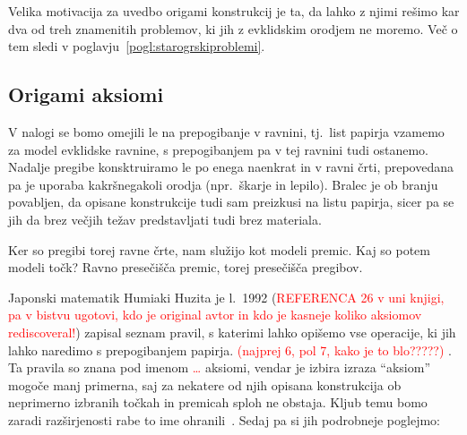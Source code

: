 Velika motivacija za uvedbo origami konstrukcij je ta, da lahko z njimi rešimo kar dva od treh znamenitih problemov, ki jih z evklidskim orodjem ne moremo. Več o tem sledi v poglavju~\ref{pogl:starogrskiproblemi}.

\subsection{Origami aksiomi}

V nalogi se bomo omejili le na prepogibanje v ravnini, tj.\ list papirja vzamemo za model evklidske ravnine, s prepogibanjem pa v tej ravnini tudi ostanemo. Nadalje pregibe konsktruiramo le po enega naenkrat in v ravni črti, prepovedana pa je uporaba kakršnegakoli orodja (npr.\ škarje in lepilo).  Bralec je ob branju povabljen, da opisane konstrukcije tudi sam preizkusi na listu papirja, sicer pa se jih da brez večjih težav predstavljati tudi brez materiala.

Ker so pregibi torej ravne črte, nam služijo kot modeli premic. Kaj so potem modeli točk? Ravno presečišča premic, torej presečišča pregibov.

Japonski matematik Humiaki Huzita je l.\ 1992 (\textcolor{red}{REFERENCA 26 v uni knjigi, pa v bistvu ugotovi, kdo je original avtor in kdo je kasneje koliko aksiomov rediscoveral!}) zapisal seznam pravil, s katerimi lahko opišemo vse operacije, ki jih lahko naredimo s prepogibanjem papirja. \textcolor{red}{(najprej 6, pol 7, kako je to blo?????)}
. Ta pravila so znana pod imenom \textcolor{red}{\ldots} aksiomi, vendar je izbira izraza ``aksiom'' mogoče manj primerna, saj za nekatere od njih opisana konstrukcija ob neprimerno izbranih točkah in premicah sploh ne obstaja. Kljub temu bomo zaradi razširjenosti rabe to ime ohranili~\cite[str.\ 7]{zore2022}. Sedaj pa si jih podrobneje poglejmo:

\renewcommand{\theaksiom}{O\arabic{aksiom}}

